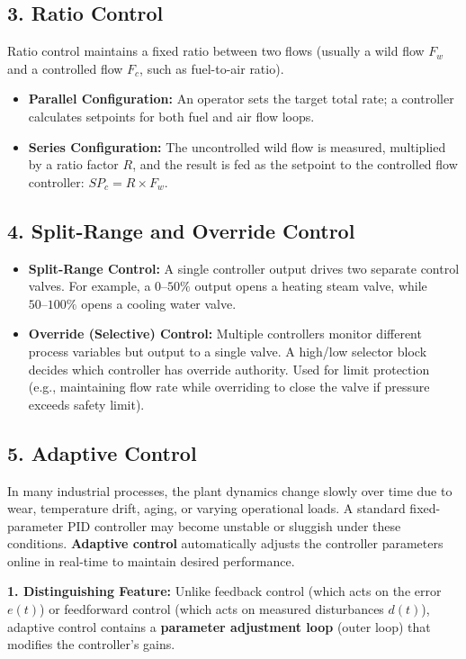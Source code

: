 \documentclass[12pt,a4paper]{article}
\begin{document}
\subsection{3. Ratio Control}
Ratio control maintains a fixed ratio between two flows (usually a wild flow $F_w$ and a controlled flow $F_c$, such as fuel-to-air ratio).
\begin{itemize}[leftmargin=*, itemsep=2.5pt]
  \item \textbf{Parallel Configuration:} An operator sets the target total rate; a controller calculates setpoints for both fuel and air flow loops.
  \item \textbf{Series Configuration:} The uncontrolled wild flow is measured, multiplied by a ratio factor $R$, and the result is fed as the setpoint to the controlled flow controller: $SP_c = R \times F_w$.
\end{itemize}

\subsection{4. Split-Range and Override Control}
\begin{itemize}[leftmargin=*, itemsep=2.5pt]
  \item \textbf{Split-Range Control:} A single controller output drives two separate control valves. For example, a $0\text{--}50\%$ output opens a heating steam valve, while $50\text{--}100\%$ opens a cooling water valve.
  \item \textbf{Override (Selective) Control:} Multiple controllers monitor different process variables but output to a single valve. A high/low selector block decides which controller has override authority. Used for limit protection (e.g., maintaining flow rate while overriding to close the valve if pressure exceeds safety limit).
\end{itemize}

\subsection{5. Adaptive Control}
In many industrial processes, the plant dynamics change slowly over time due to wear, temperature drift, aging, or varying operational loads. A standard fixed-parameter PID controller may become unstable or sluggish under these conditions. \textbf{Adaptive control} automatically adjusts the controller parameters online in real-time to maintain desired performance.

\textbf{1. Distinguishing Feature:}
Unlike feedback control (which acts on the error $e(t)$) or feedforward control (which acts on measured disturbances $d(t)$), adaptive control contains a \textbf{parameter adjustment loop} (outer loop) that modifies the controller's gains.
\end{document}
